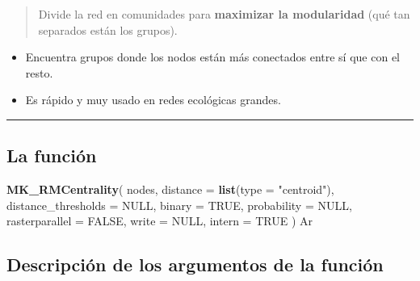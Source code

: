 \documentclass[
]{book}
\newenvironment{Shaded}{\begin{snugshade}}{\end{snugshade}}
\newcommand{\AttributeTok}[1]{\textcolor[rgb]{0.13,0.29,0.53}{#1}}
\newcommand{\ConstantTok}[1]{\textcolor[rgb]{0.56,0.35,0.01}{#1}}
\newcommand{\FunctionTok}[1]{\textcolor[rgb]{0.13,0.29,0.53}{\textbf{#1}}}
\newcommand{\NormalTok}[1]{#1}
\newcommand{\StringTok}[1]{\textcolor[rgb]{0.31,0.60,0.02}{#1}}
\providecommand{\tightlist}{%
  \setlength{\itemsep}{0pt}\setlength{\parskip}{0pt}}
\begin{document}
\begin{quote}
Divide la red en comunidades para \textbf{maximizar la modularidad} (qué tan separados están los grupos).
\end{quote}

\begin{itemize}
\tightlist
\item
  Encuentra grupos donde los nodos están más conectados entre sí que con el resto.
\item
  Es rápido y muy usado en redes ecológicas grandes.
\end{itemize}

\begin{center}\rule{0.5\linewidth}{0.5pt}\end{center}

\subsection{La función}\label{la-funciuxf3n}

\begin{Shaded}
\begin{Highlighting}[]
\FunctionTok{MK\_RMCentrality}\NormalTok{(}
\NormalTok{  nodes,}
  \AttributeTok{distance =} \FunctionTok{list}\NormalTok{(}\AttributeTok{type =} \StringTok{"centroid"}\NormalTok{),}
  \AttributeTok{distance\_thresholds =} \ConstantTok{NULL}\NormalTok{,}
  \AttributeTok{binary =} \ConstantTok{TRUE}\NormalTok{,}
  \AttributeTok{probability =} \ConstantTok{NULL}\NormalTok{,}
  \AttributeTok{rasterparallel =} \ConstantTok{FALSE}\NormalTok{,}
  \AttributeTok{write =} \ConstantTok{NULL}\NormalTok{,}
  \AttributeTok{intern =} \ConstantTok{TRUE}
\NormalTok{)}
\NormalTok{Ar}
\end{Highlighting}
\end{Shaded}

\subsection{Descripción de los argumentos de la función}\label{descripciuxf3n-de-los-argumentos-de-la-funciuxf3n}
\end{document}
